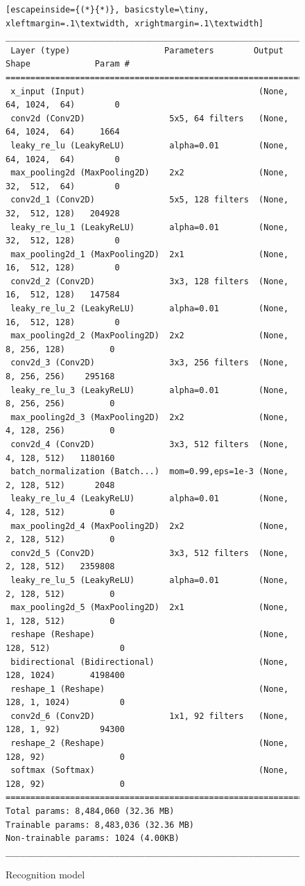 \begin{figure}[htbp]
\begin{lstlisting}[escapeinside={(*}{*)}, basicstyle=\tiny, xleftmargin=.1\textwidth, xrightmargin=.1\textwidth]
__________________________________________________________________________________
 Layer (type)                   Parameters        Output Shape             Param #
==================================================================================
 x_input (Input)                                   (None,  64, 1024,  64)        0
 conv2d (Conv2D)                 5x5, 64 filters   (None,  64, 1024,  64)     1664
 leaky_re_lu (LeakyReLU)         alpha=0.01        (None,  64, 1024,  64)        0
 max_pooling2d (MaxPooling2D)    2x2               (None,  32,  512,  64)        0
 conv2d_1 (Conv2D)               5x5, 128 filters  (None,  32,  512, 128)   204928
 leaky_re_lu_1 (LeakyReLU)       alpha=0.01        (None,  32,  512, 128)        0
 max_pooling2d_1 (MaxPooling2D)  2x1               (None,  16,  512, 128)        0
 conv2d_2 (Conv2D)               3x3, 128 filters  (None,  16,  512, 128)   147584
 leaky_re_lu_2 (LeakyReLU)       alpha=0.01        (None,  16,  512, 128)        0
 max_pooling2d_2 (MaxPooling2D)  2x2               (None,   8, 256, 128)         0
 conv2d_3 (Conv2D)               3x3, 256 filters  (None,   8, 256, 256)    295168
 leaky_re_lu_3 (LeakyReLU)       alpha=0.01        (None,   8, 256, 256)         0
 max_pooling2d_3 (MaxPooling2D)  2x2               (None,   4, 128, 256)         0
 conv2d_4 (Conv2D)               3x3, 512 filters  (None,   4, 128, 512)   1180160
 batch_normalization (Batch...)  mom=0.99,eps=1e-3 (None,   2, 128, 512)      2048
 leaky_re_lu_4 (LeakyReLU)       alpha=0.01        (None,   4, 128, 512)         0
 max_pooling2d_4 (MaxPooling2D)  2x2               (None,   2, 128, 512)         0 
 conv2d_5 (Conv2D)               3x3, 512 filters  (None,   2, 128, 512)   2359808
 leaky_re_lu_5 (LeakyReLU)       alpha=0.01        (None,   2, 128, 512)         0
 max_pooling2d_5 (MaxPooling2D)  2x1               (None,   1, 128, 512)         0
 reshape (Reshape)                                 (None, 128, 512)              0
 bidirectional (Bidirectional)                     (None, 128, 1024)       4198400
 reshape_1 (Reshape)                               (None, 128, 1, 1024)          0
 conv2d_6 (Conv2D)               1x1, 92 filters   (None, 128, 1, 92)        94300
 reshape_2 (Reshape)                               (None, 128, 92)               0
 softmax (Softmax)                                 (None, 128, 92)               0
==================================================================================
Total params: 8,484,060 (32.36 MB)
Trainable params: 8,483,036 (32.36 MB)
Non-trainable params: 1024 (4.00KB)
__________________________________________________________________________________
\end{lstlisting}
\caption{Recognition model}
\label{FigRecModel}
\end{figure}


